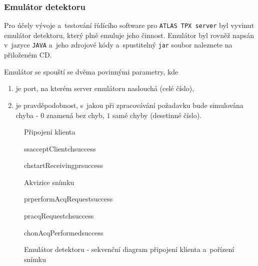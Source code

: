 \subsubsection{Emulátor detektoru}
Pro účely vývoje a~testování řídícího software pro \texttt{ATLAS TPX server} byl vyvinut emulátor detektoru, který plně emuluje jeho činnost. Emulátor byl rovněž napsán v~jazyce \texttt{JAVA} a~jeho zdrojové kódy a~spustitelný \texttt{jar} soubor naleznete na přiloženém CD.

Emulátor se spouští se dvěma povinnými parametry, kde
\begin{enumerate}
	\item je port, na kterém server emulátoru naslouchá (celé číslo),
	\item je pravděpodobnost, s~jakou při zpracovávání požadavku bude simulována chyba - $0$ znamená bez chyb, $1$ samé chyby (desetinné číslo).
\end{enumerate}

\begin{figure}[t]
	\begin{center}
		\begin{sequencediagram}
			\begin{sdblock}{Připojení klienta}{}
				\begin{call}{ss}{acceptClient}{ch}{success}
					\begin{call}{ch}{startReceiving}{pr}{success}
					\end{call}
				\end{call}
			\end{sdblock}
			\begin{sdblock}{Akvizice snímku}{}
				\begin{callself}{pr}{performAcqRequest}{success}
					\begin{call}{pr}{acqRequest}{ch}{success}
					\end{call}	
				\end{callself}	
				\postlevel
				\begin{callself}{ch}{onAcqPerformed}{success}
				\end{callself}	
			\end{sdblock}			
		\end{sequencediagram}
		\caption{Emulátor detektoru - sekvenční diagram připojení klienta a~pořízení snímku}
		\label{fig:uml:emulator}
	\end{center}
\end{figure}

